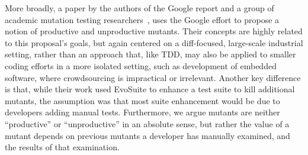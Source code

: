 More broadly, a paper by the
authors of the Google report and a group of academic mutation testing
researchers~\cite{ivankovic2018industrial}, uses the Google effort to
propose a notion of productive and unproductive mutants.  Their
concepts are highly related to this proposal's goals, but again centered on a
diff-focused, large-scale industrial setting, rather than an approach
that, like TDD, may also be applied to smaller coding efforts in a more
isolated setting, such as development of embedded software, where
crowdsourcing is impractical or irrelevant.  Another key difference is that, while their
work used EvoSuite to enhance a test suite to kill additional mutants,
the assumption was that most suite enhancement would be due to
developers adding manual tests.  Furthermore, we argue mutants
are neither ``productive'' or ``unproductive'' in an absolute sense, but
rather the value of a mutant depends on previous mutants a
developer has manually examined, and the results of that examination.



%
